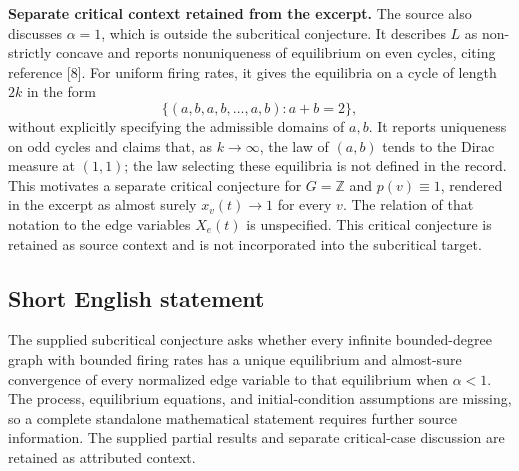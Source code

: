 \documentclass[11pt]{article}
\begin{document}
\textbf{Separate critical context retained from the excerpt.} The source also discusses \(\alpha=1\), which is outside the subcritical conjecture. It describes \(L\) as non-strictly concave and reports nonuniqueness of equilibrium on even cycles, citing reference [8]. For uniform firing rates, it gives the equilibria on a cycle of length \(2k\) in the form
\[
\{(a,b,a,b,\ldots,a,b):a+b=2\},
\]
without explicitly specifying the admissible domains of \(a,b\). It reports uniqueness on odd cycles and claims that, as \(k\to\infty\), the law of \((a,b)\) tends to the Dirac measure at \((1,1)\); the law selecting these equilibria is not defined in the record. This motivates a separate critical conjecture for \(G=\mathbb Z\) and \(p(v)\equiv1\), rendered in the excerpt as almost surely \(x_v(t)\to1\) for every \(v\). The relation of that notation to the edge variables \(X_e(t)\) is unspecified. This critical conjecture is retained as source context and is not incorporated into the subcritical target.
\subsection{Short English statement}
The supplied subcritical conjecture asks whether every infinite bounded-degree graph with bounded firing rates has a unique equilibrium and almost-sure convergence of every normalized edge variable to that equilibrium when \(\alpha<1\). The process, equilibrium equations, and initial-condition assumptions are missing, so a complete standalone mathematical statement requires further source information. The supplied partial results and separate critical-case discussion are retained as attributed context.
\end{document}

